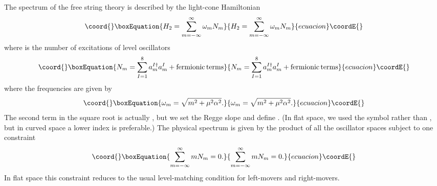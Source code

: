 \documentclass[a4paper,12pt]{article}
\begin{document}
The spectrum of the free string theory is described by the
light-cone Hamiltonian
\begin{equation}\coord{}\boxEquation{
H_2 = \sum_{m= -\infty}^{\infty} \omega_m N_m
}{
H_2 = \sum_{m= -\infty}^{\infty} \omega_m N_m
}{ecuacion}\coordE{}\end{equation}
where \coordHE{} is the number of excitations of level \coordHE{} oscillators
\begin{equation}\coord{}\boxEquation{
N_m = \sum_{I=1}^8 a_m^{I \dagger} a_m^I + {\rm fermionic\, terms}
}{
N_m = \sum_{I=1}^8 a_m^{I \dagger} a_m^I + {\rm fermionic\, terms}
}{ecuacion}\coordE{}\end{equation}
where the frequencies are given by
\begin{equation}\coord{}\boxEquation{
\omega_m = \sqrt{m^2 + \mu^2 \alpha^2}.
}{
\omega_m = \sqrt{m^2 + \mu^2 \alpha^2}.
}{ecuacion}\coordE{}\end{equation}
The second term in the square root is actually \coordHE{}, but we set the Regge slope \coordHE{} and define \coordHE{}. (In flat space, we used the symbol \coordHE{} rather than
\coordHE{}, but in curved space a lower index is preferable.) The
physical spectrum is given by the product of all the oscillator
spaces subject to one constraint
\begin{equation}\coord{}\boxEquation{
\sum_{m= -\infty}^{\infty} m N_m =0.
}{
\sum_{m= -\infty}^{\infty} m N_m =0.
}{ecuacion}\coordE{}\end{equation}
In flat space this constraint reduces to the usual level-matching
condition for left-movers and right-movers.
\end{document}
